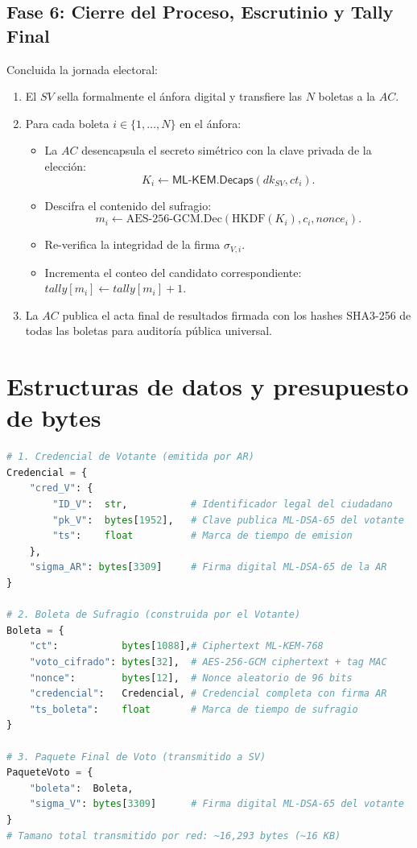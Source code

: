 \documentclass[11pt,a4paper,twoside,openright]{book}
\theoremstyle{plain}
\theoremstyle{definition}
\theoremstyle{remark}
\newcommand{\MLKEM}{\textsf{ML-KEM}}
\newcommand{\Decaps}{\mathsf{Decaps}}
\begin{document}
\subsection{Fase 6: Cierre del Proceso, Escrutinio y Tally Final}
Concluida la jornada electoral:
\begin{enumerate}
  \item El $SV$ sella formalmente el \'anfora digital y transfiere las $N$ boletas a la $AC$.
  \item Para cada boleta $i \in \{1, \ldots, N\}$ en el \'anfora:
  \begin{itemize}
    \item La $AC$ desencapsula el secreto sim\'etrico con la clave privada de la elecci\'on:
    \[
      K_i \leftarrow \MLKEM.\Decaps(dk_{SV}, ct_i).
    \]
    \item Descifra el contenido del sufragio:
    \[
      m_i \leftarrow \mathrm{AES}\text{-}256\text{-}\mathrm{GCM.Dec}(\mathrm{HKDF}(K_i), c_i, \mathit{nonce}_i).
    \]
    \item Re-verifica la integridad de la firma $\sigma_{V, i}$.
    \item Incrementa el conteo del candidato correspondiente: $\mathit{tally}[m_i] \leftarrow \mathit{tally}[m_i] + 1$.
  \end{itemize}
  \item La $AC$ publica el acta final de resultados firmada con los hashes SHA3-256 de todas las boletas para auditor\'ia p\'ublica universal.
\end{enumerate}

\section{Estructuras de datos y presupuesto de bytes}

\begin{lstlisting}[language=Python, caption={Definici\'on formal de las estructuras de datos en src/pqc/}]
# 1. Credencial de Votante (emitida por AR)
Credencial = {
    "cred_V": {
        "ID_V":  str,           # Identificador legal del ciudadano
        "pk_V":  bytes[1952],   # Clave publica ML-DSA-65 del votante
        "ts":    float          # Marca de tiempo de emision
    },
    "sigma_AR": bytes[3309]     # Firma digital ML-DSA-65 de la AR
}

# 2. Boleta de Sufragio (construida por el Votante)
Boleta = {
    "ct":           bytes[1088],# Ciphertext ML-KEM-768
    "voto_cifrado": bytes[32],  # AES-256-GCM ciphertext + tag MAC
    "nonce":        bytes[12],  # Nonce aleatorio de 96 bits
    "credencial":   Credencial, # Credencial completa con firma AR
    "ts_boleta":    float       # Marca de tiempo de sufragio
}

# 3. Paquete Final de Voto (transmitido a SV)
PaqueteVoto = {
    "boleta":  Boleta,
    "sigma_V": bytes[3309]      # Firma digital ML-DSA-65 del votante
}
# Tamano total transmitido por red: ~16,293 bytes (~16 KB)
\end{lstlisting}
\end{document}
